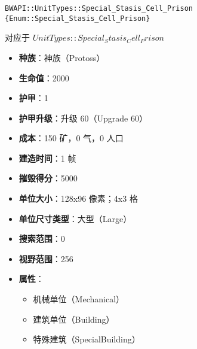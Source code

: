 \begin{tcolorbox}[colback=white, colframe=black!60!white, title=Special\_Stasis\_Cell\_Prison(), arc=0mm]
    \begin{verbatim}
BWAPI::UnitTypes::Special_Stasis_Cell_Prison {Enum::Special_Stasis_Cell_Prison}
    \end{verbatim}
    对应于  $ UnitTypes::Special_Stasis_Cell_Prison $ 
    \begin{itemize}
        \item \textbf{种族}：神族（Protoss）
        \item \textbf{生命值}：2000
        \item \textbf{护甲}：1
        \item \textbf{护甲升级}：升级 60（Upgrade 60）
        \item \textbf{成本}：150 矿，0 气，0 人口
        \item \textbf{建造时间}：1 帧
        \item \textbf{摧毁得分}：5000
        \item \textbf{单位大小}：128x96 像素；4x3 格
        \item \textbf{单位尺寸类型}：大型（Large）
        \item \textbf{搜索范围}：0
        \item \textbf{视野范围}：256
        \item \textbf{属性}：
            \begin{itemize}
                \item 机械单位（Mechanical）
                \item 建筑单位（Building）
                \item 特殊建筑（SpecialBuilding）
            \end{itemize}
    \end{itemize}
\end{tcolorbox}

